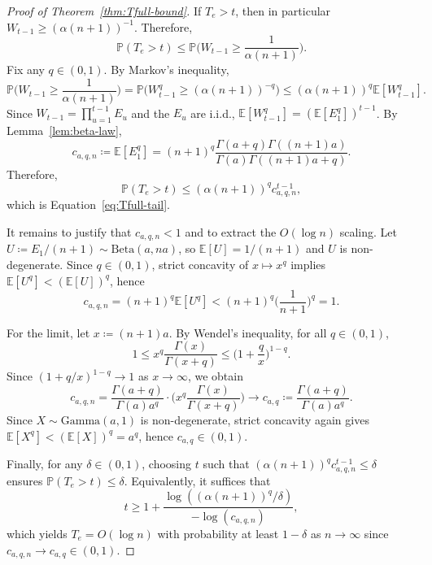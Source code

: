 \documentclass{uai2026} %
\newcommand{\1}{\mathbf{1}}
\newcommand{\prob}{\mathbb{P}}
\newcommand{\expec}{\mathbb{E}}
\begin{document}
\begin{proof}[Proof of Theorem~\ref{thm:Tfull-bound}]
  If $T_e>t$, then in particular $W_{t-1}\ge (\alpha(n+1))^{-1}$.
  Therefore,
  \begin{equation*}
    \prob(T_e>t)
    \le \prob\Big(W_{t-1}\ge \frac{1}{\alpha(n+1)}\Big).
  \end{equation*}
  Fix any $q\in(0,1)$.
  By Markov's inequality,
  \begin{equation*}
    \prob\Big(W_{t-1}\ge \frac{1}{\alpha(n+1)}\Big)
    =\prob\Big(W_{t-1}^q\ge (\alpha(n+1))^{-q}\Big)
    \le (\alpha(n+1))^{q} \expec[W_{t-1}^q].
  \end{equation*}
  Since $W_{t-1}=\prod_{u=1}^{t-1} E_{u}$ and the $E_{u}$ are i.i.d., $\expec[W_{t-1}^q]=(\expec[E_{1}^q])^{t-1}$.
  By Lemma~\ref{lem:beta-law},
  \begin{equation*}
    c_{a,q,n}\coloneqq \expec[E_{1}^q]
    =(n+1)^q\frac{\Gamma(a+q)\Gamma((n+1)a)}{\Gamma(a)\Gamma((n+1)a+q)}.
  \end{equation*}
  Therefore,
  \begin{equation*}
    \prob(T_e>t)\le (\alpha(n+1))^{q} c_{a,q,n}^{t-1},
  \end{equation*}
  which is Equation~\eqref{eq:Tfull-tail}.

  It remains to justify that $c_{a,q,n}<1$ and to extract the $O(\log n)$ scaling.
  Let $U\coloneqq E_{1}/(n+1)\sim\mathrm{Beta}(a,na)$, so $\expec[U]=1/(n+1)$ and $U$ is non-degenerate.
  Since $q\in(0,1)$, strict concavity of $x\mapsto x^q$ implies $\expec[U^q]<(\expec[U])^q$, hence
  \begin{equation*}
    c_{a,q,n}
    =(n+1)^q\expec[U^q]
    < (n+1)^q\Big(\frac{1}{n+1}\Big)^q
    =1.
  \end{equation*}

  For the limit, let $x\coloneqq (n+1)a$.
  By Wendel's inequality, for all $q\in(0,1)$,
  \begin{equation*}
    1
    \le x^q\frac{\Gamma(x)}{\Gamma(x+q)}
    \le \Big(1+\frac{q}{x}\Big)^{1-q}.
  \end{equation*}
  Since $(1+q/x)^{1-q}\to 1$ as $x\to\infty$, we obtain
  \begin{equation*}
    c_{a,q,n}
    =\frac{\Gamma(a+q)}{\Gamma(a)a^q}\cdot \Big(x^q\frac{\Gamma(x)}{\Gamma(x+q)}\Big)
    \to c_{a,q}\coloneqq \frac{\Gamma(a+q)}{\Gamma(a)a^q}.
  \end{equation*}
  Since $X\sim\mathrm{Gamma}(a,1)$ is non-degenerate, strict concavity again gives $\expec[X^q]<(\expec[X])^q=a^q$, hence $c_{a,q}\in(0,1)$.

  Finally, for any $\delta\in(0,1)$, choosing $t$ such that $(\alpha(n+1))^{q} c_{a,q,n}^{t-1}\le \delta$ ensures $\prob(T_e>t)\le \delta$.
  Equivalently, it suffices that
  \begin{equation*}
    t
    \ge 1+\frac{\log((\alpha(n+1))^q/\delta)}{-\log(c_{a,q,n})},
  \end{equation*}
  which yields $T_e=O(\log n)$ with probability at least $1-\delta$ as $n\to\infty$ since $c_{a,q,n}\to c_{a,q}\in(0,1)$.
\end{proof}
\end{document}
